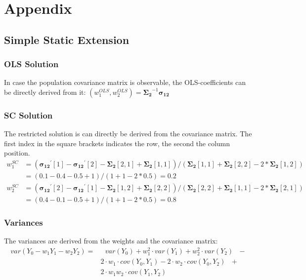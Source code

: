\section{Appendix}
\subsection{Simple Static Extension}
\subsubsection{OLS Solution}
In case the population covariance matrix is observable, the OLS-coefficients can be directly derived from it: $\left( w_1^{OLS}, w_2^{OLS} \right) = \boldsymbol{\Sigma_2}^{-1} \boldsymbol{\sigma_{12}}  $
\subsubsection{SC Solution}
The restricted solution is can directly be derived from the covariance matrix. The first index in the square brackets indicates the row, the second the column position. 
\begin{equation*}
	\begin{split}
		w_1^{SC} & = \left( \boldsymbol{\sigma_{12}}^\prime[1] - \boldsymbol{\sigma_{12}}^\prime[2] - \boldsymbol{\Sigma_2}[2,1] + \boldsymbol{\Sigma_2}[1,1] \right) / \left( \boldsymbol{\Sigma_2}[1,1] + \boldsymbol{\Sigma_2}[2,2] - 2 * \boldsymbol{\Sigma_2}[1,2] \right) \\
		& = (0.1-0.4-0.5+1)/(1+1-2*0.5) = 0.2 
	\end{split} 
\end{equation*}
\begin{equation*}
	\begin{split}
		w_2^{SC} & = \left( \boldsymbol{\sigma_{12}}^\prime[2] - \boldsymbol{\sigma_{12}}^\prime[1] - \boldsymbol{\Sigma_2}[1,2] + \boldsymbol{\Sigma_2}[2,2] \right) / \left( \boldsymbol{\Sigma_2}[2,2] + \boldsymbol{\Sigma_2}[1,1] - 2 * \boldsymbol{\Sigma_2}[2,1] \right) \\
		& = (0.4-0.1-0.5+1)/(1+1-2*0.5) = 0.8
	\end{split}
\end{equation*}
\subsubsection{Variances}
The variances are derived from the weights and the covariance matrix:
\begin{equation*}
	\begin{split}
		var(Y_0 - w_1 Y_1 - w_2 Y_2) = &\text{ }var(Y_0) + w_1^2 \cdot var(Y_1) + w_2^2 \cdot var(Y_2)\text{ }- \\
		& 2 \cdot w_1 \cdot cov(Y_0, Y_1) - 2 \cdot w_2 \cdot cov(Y_0, Y_2)\text{ }+ \\
		&2 \cdot w_1 w_2 \cdot cov(Y_1, Y_2) 
	\end{split}
\end{equation*}

